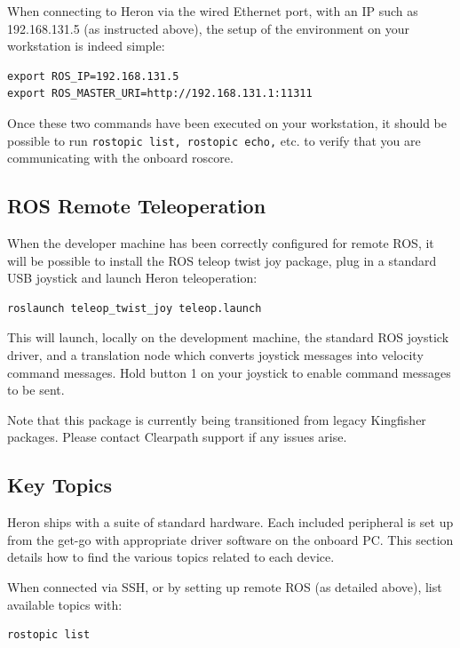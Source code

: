 \documentclass[]{clearpath-latex/clearpath-manual}
\begin{document}
When connecting to Heron via the wired Ethernet port, with an IP such as 192.168.131.5 (as instructed above), the setup of the environment on your workstation is indeed simple:

\begin{lstlisting}
export ROS_IP=192.168.131.5
export ROS_MASTER_URI=http://192.168.131.1:11311
\end{lstlisting}

Once these two commands have been executed on your workstation, it should be possible to run \lstinline{rostopic list, rostopic echo,} etc. to verify that you are communicating with the onboard roscore.



\subsection{ROS Remote Teleoperation}

When the developer machine has been correctly configured for remote ROS, it will be possible to install the ROS teleop twist joy package, plug in a standard USB joystick and launch Heron teleoperation:

\begin{lstlisting}
roslaunch teleop_twist_joy teleop.launch
\end{lstlisting}

This will launch, locally on the development machine, the standard ROS joystick driver, and a translation node which converts joystick messages into velocity command messages. Hold button 1 on your joystick to enable command messages to be sent.

Note that this package is currently being transitioned from legacy Kingfisher packages. Please contact Clearpath support if any issues arise.

\pagebreak

\subsection{Key Topics}
Heron ships with a suite of standard hardware. Each included peripheral is set up from the get-go with appropriate driver software on the onboard PC. This section details how to find the various topics related to each device.

When connected via SSH, or by setting up remote ROS (as detailed above), list available topics with:

\begin{lstlisting}
rostopic list
\end{lstlisting}
\end{document}
